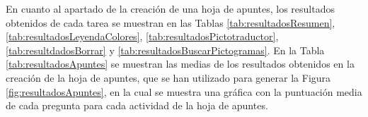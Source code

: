 En cuanto al apartado de la creación de una hoja de apuntes, los resultados obtenidos de cada tarea se muestran en las Tablas \ref{tab:resultadosResumen}, \ref{tab:resultadosLeyendaColores}, \ref{tab:resultadosPictotraductor}, \ref{tab:resultdadosBorrar} y \ref{tab:resultadosBuscarPictogramas}. En la Tabla \ref{tab:resultadosApuntes} se muestran las medias de los resultados obtenidos en la creación de la hoja de apuntes, que se han utilizado para generar la Figura \ref{fig:resultadosApuntes}, en la cual se muestra una gráfica con la puntuación media de cada pregunta para cada actividad de la hoja de apuntes.

\begin{table}[H]
\end{table}
